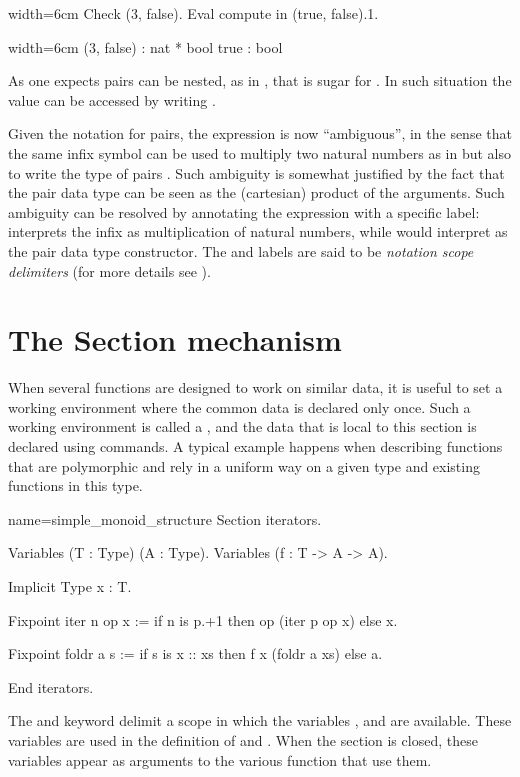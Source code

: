 \begin{coq}{}{width=6cm}
Check (3, false).
Eval compute in (true, false).1.
\end{coq}
\begin{coqout}{}{width=6cm}
(3, false) : nat * bool
true : bool
\end{coqout}
As one expects pairs can be nested, as in , that is sugar
for .  In such situation the value  can be
accessed by writing .

Given the notation for pairs, the expression  is now ``ambiguous'',
in the sense that the same infix \C{*} symbol can be used to multiply two
natural numbers as in  but also to write the type of pairs .  Such ambiguity is somewhat justified by the fact that the pair
data type can be seen as the (cartesian) product of the arguments.  Such
ambiguity can be resolved by annotating the expression with a specific
label:  interprets the infix \C{*} as multiplication of natural numbers,
while  would interpret \C{*} as the pair data type
constructor. The  and  labels are said to be
\emph{notation scope delimiters} (for more details see
\cite[section 12.2]{Coq:manual}).

\section{The Section mechanism}
When several functions are designed to work on similar data, it is
useful to set a working environment where the common data is declared
only once.  Such a working environment is called a , and
the data that is local to this section is declared using 
commands.  A typical example happens when describing functions that
are polymorphic and rely in a uniform way on a given type and existing
functions in this type.

\begin{coq}{name=simple_monoid_structure}{}
Section iterators.

Variables (T : Type) (A : Type).
Variables (f : T -> A -> A).

Implicit Type x : T.

Fixpoint iter n op x :=
  if n is p.+1 then op (iter p op x) else x.

Fixpoint foldr a s :=
  if s is x :: xs then f x (foldr a xs) else a.

End iterators.
\end{coq}
The  and  keyword delimit a scope in which
the variables ,  and  are available.  These variables
are used in the definition of  and .  When
the section is closed, these variables appear as arguments to
the various function that use them.

